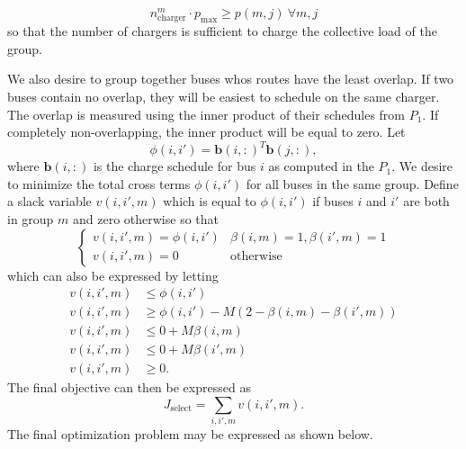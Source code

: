 \begin{equation}\label{eqn:groups:chargeLimit}
	n^m_{\text{charger}}\cdot p_{\text{max}} \ge p(m,j) \ \forall m,j
\end{equation}
so that the number of chargers is sufficient to charge the collective load of the group. 
\par We also desire to group together buses whos routes have the least overlap. If two buses contain no overlap, they will be easiest to schedule on the same charger.  The overlap is measured using the inner product of their schedules from $P_1$.  If completely non-overlapping, the inner product will be equal to zero. Let
\begin{equation*}
\phi(i,i') = \mathbf{b}(i,:)^T\mathbf{b}(j,:),
\end{equation*}
where $\mathbf{b}(i,:)$ is the charge schedule for bus $i$ as computed in the $P_1$. We desire to minimize the total cross terms $\phi(i,i')$ for all buses in the same group.  Define a slack variable $v(i,i',m)$ which is equal to $\phi(i,i')$ if buses $i$ and $i'$ are both in group $m$ and zero otherwise so that
\begin{equation*}
	\begin{cases}
		v(i,i',m) = \phi(i,i') & \beta(i,m) = 1, \beta(i',m) = 1 \\
		v(i,i',m) = 0 & \text{otherwise}
	\end{cases}
\end{equation*}
which can also be expressed by letting
\begin{equation}\label{eqn:groups:innerProd}\begin{aligned}
	v(i,i',m) &\le \phi(i,i') \\
	v(i,i',m) &\ge \phi(i,i') - M\left (2 - \beta(i,m) - \beta(i',m)\right ) \\
	v(i,i',m) &\le 0 + M\beta(i,m) \\
	v(i,i',m) &\le 0 + M\beta(i',m) \\
	v(i,i',m) &\ge 0.
\end{aligned}\end{equation}
The final objective can then be expressed as
\begin{equation}\label{eqn:groups:objective}
	J_{\text{select}} = \sum_{i,i',m} v(i,i',m).
\end{equation}
The final optimization problem may be expressed as shown below. \\[0.1in]
